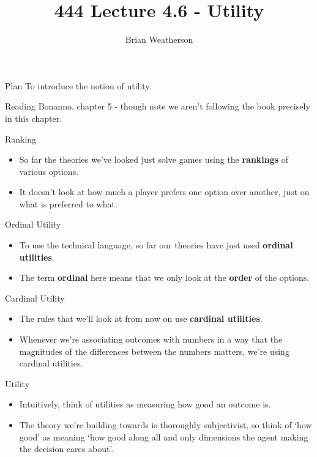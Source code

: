\documentclass[
  ignorenonframetext,
]{beamer}
\title{444 Lecture 4.6 - Utility}
\author{Brian Weatherson}
\date{}
\providecommand{\tightlist}{%
  \setlength{\itemsep}{0pt}\setlength{\parskip}{0pt}}
\begin{document}
\frame{\titlepage}

\begin{frame}{Plan}
\protect\hypertarget{plan}{}
To introduce the notion of utility.
\end{frame}

\begin{frame}{Reading}
\protect\hypertarget{reading}{}
Bonanno, chapter 5 - though note we aren't following the book precisely
in this chapter.
\end{frame}

\begin{frame}{Ranking}
\protect\hypertarget{ranking}{}
\begin{itemize}
\tightlist
\item
  So far the theories we've looked just solve games using the
  \textbf{rankings} of various options.
\item
  It doesn't look at how much a player prefers one option over another,
  just on what is preferred to what.
\end{itemize}
\end{frame}

\begin{frame}{Ordinal Utility}
\protect\hypertarget{ordinal-utility}{}
\begin{itemize}
\tightlist
\item
  To use the technical language, so far our theories have just used
  \textbf{ordinal utilities}.
\item
  The term \textbf{ordinal} here means that we only look at the
  \textbf{order} of the options.
\end{itemize}
\end{frame}

\begin{frame}{Cardinal Utility}
\protect\hypertarget{cardinal-utility}{}
\begin{itemize}
\tightlist
\item
  The rules that we'll look at from now on use \textbf{cardinal
  utilities}.
\item
  Whenever we're associating outcomes with numbers in a way that the
  magnitudes of the differences between the numbers matters, we're using
  cardinal utilities.
\end{itemize}
\end{frame}

\begin{frame}{Utility}
\protect\hypertarget{utility}{}
\begin{itemize}
\tightlist
\item
  Intuitively, think of utilities as measuring how good an outcome is.
\item
  The theory we're building towards is thoroughly subjectivist, so think
  of `how good' as meaning `how good along all and only dimensions the
  agent making the decision cares about'.
\end{itemize}
\end{frame}
\end{document}
